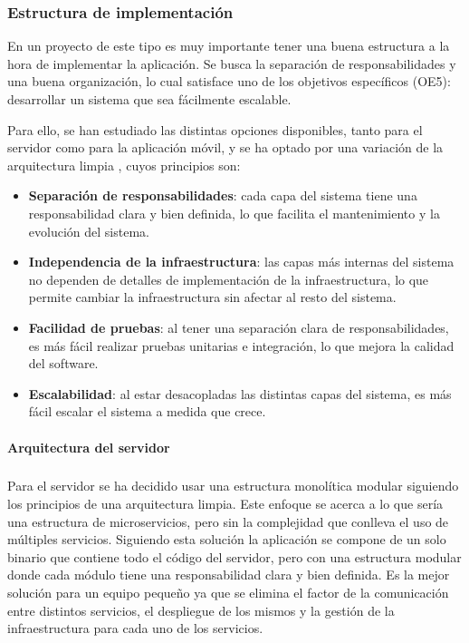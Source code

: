 \subsubsection{Estructura de implementación}
En un proyecto de este tipo es muy importante tener una buena estructura a la hora de implementar la aplicación.
Se busca la separación de responsabilidades y una buena organización, lo cual satisface uno de los objetivos específicos (OE5): desarrollar un sistema que sea fácilmente escalable.

Para ello, se han estudiado las distintas opciones disponibles, tanto para el servidor como para la aplicación móvil, y se ha optado por una variación de la arquitectura limpia \parencite{uncle-bob-clean-architecture}, cuyos principios son:
\begin{itemize}
    \item \textbf{Separación de responsabilidades}: cada capa del sistema tiene una responsabilidad clara y bien definida, lo que facilita el mantenimiento y la evolución del sistema.
    \item \textbf{Independencia de la infraestructura}: las capas más internas del sistema no dependen de detalles de implementación de la infraestructura, lo que permite cambiar la infraestructura sin afectar al resto del sistema.
    \item \textbf{Facilidad de pruebas}: al tener una separación clara de responsabilidades, es más fácil realizar pruebas unitarias e integración, lo que mejora la calidad del software.
    \item \textbf{Escalabilidad}: al estar desacopladas las distintas capas del sistema, es más fácil escalar el sistema a medida que crece.
\end{itemize}

\paragraph{Arquitectura del servidor}
\subparagraph{}
Para el servidor se ha decidido usar una estructura monolítica modular siguiendo los principios de una arquitectura limpia.
Este enfoque se acerca a lo que sería una estructura de microservicios, pero sin la complejidad que conlleva el uso de múltiples servicios.
Siguiendo esta solución la aplicación se compone de un solo binario que contiene todo el código del servidor, pero con una estructura modular donde cada módulo tiene una responsabilidad clara y bien definida.
Es la mejor solución para un equipo pequeño ya que se elimina el factor de la comunicación entre distintos servicios, el despliegue de los mismos y la gestión de la infraestructura para cada uno de los servicios.

